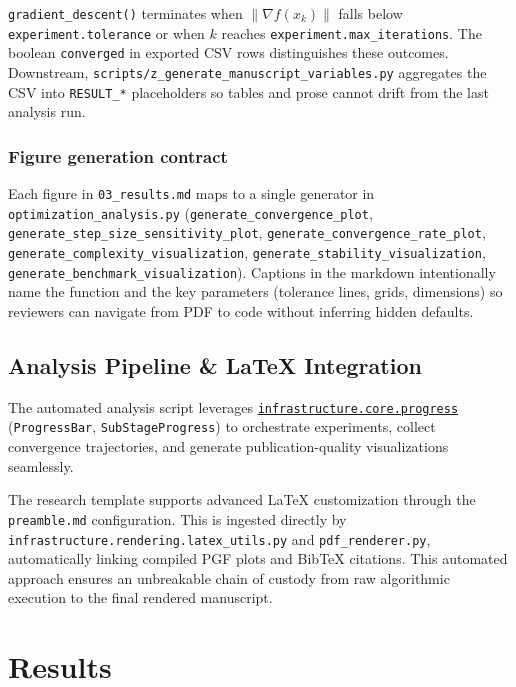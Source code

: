 \documentclass[
]{article}
\begin{document}
\texttt{gradient\_descent()} terminates when \(\|\nabla f(x_k)\|\) falls
below \texttt{experiment.tolerance} or when \(k\) reaches
\texttt{experiment.max\_iterations}. The boolean \texttt{converged} in
exported CSV rows distinguishes these outcomes. Downstream,
\texttt{scripts/z\_generate\_manuscript\_variables.py} aggregates the
CSV into \texttt{RESULT\_*} placeholders so tables and prose cannot
drift from the last analysis run.

\subsubsection{Figure generation
contract}\label{figure-generation-contract}

Each figure in \texttt{03\_results.md} maps to a single generator in
\texttt{optimization\_analysis.py}
(\texttt{generate\_convergence\_plot},
\texttt{generate\_step\_size\_sensitivity\_plot},
\texttt{generate\_convergence\_rate\_plot},
\texttt{generate\_complexity\_visualization},
\texttt{generate\_stability\_visualization},
\texttt{generate\_benchmark\_visualization}). Captions in the markdown
intentionally name the function and the key parameters (tolerance lines,
grids, dimensions) so reviewers can navigate from PDF to code without
inferring hidden defaults.

\subsection{Analysis Pipeline \& LaTeX
Integration}\label{analysis-pipeline-latex-integration}

The automated analysis script leverages
\href{https://github.com/docxology/template/blob/main/infrastructure/core/progress.py}{\texttt{infrastructure.core.progress}}
(\texttt{ProgressBar}, \texttt{SubStageProgress}) to orchestrate
experiments, collect convergence trajectories, and generate
publication-quality visualizations seamlessly.

The research template supports advanced LaTeX customization through the
\texttt{preamble.md} configuration. This is ingested directly by
\texttt{infrastructure.rendering.latex\_utils.py} and
\texttt{pdf\_renderer.py}, automatically linking compiled PGF plots and
BibTeX citations. This automated approach ensures an unbreakable chain
of custody from raw algorithmic execution to the final rendered
manuscript.

\newpage

\section{Results}\label{sec:results}
\end{document}
